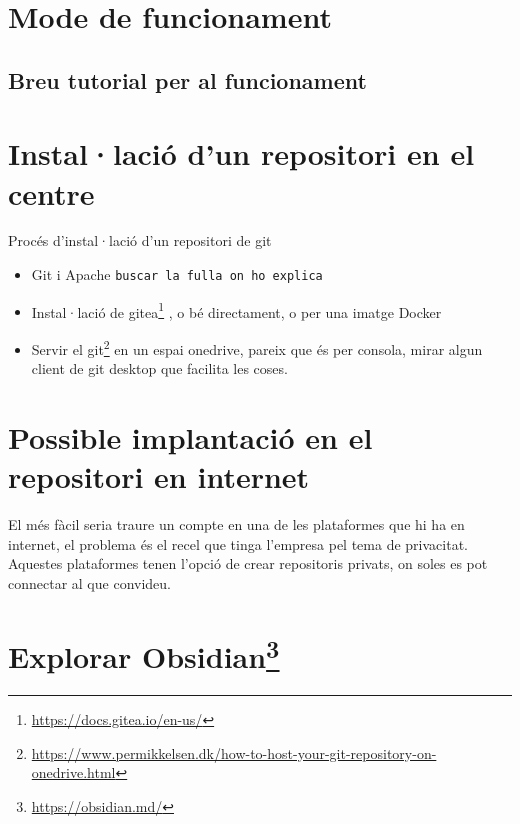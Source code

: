 \documentclass[
  10pt,
]{krantz}
\DeclareRobustCommand{\href}[2]{#2\footnote{\url{#1}}}
\begin{document}
\hypertarget{mode-de-funcionament}{%
\section{Mode de funcionament}\label{mode-de-funcionament}}

\hypertarget{breu-tutorial-per-al-funcionament}{%
\subsection{Breu tutorial per al funcionament}\label{breu-tutorial-per-al-funcionament}}

\hypertarget{installaciuxf3-dun-repositori-en-el-centre}{%
\section{Instal·lació d'un repositori en el centre}\label{installaciuxf3-dun-repositori-en-el-centre}}

Procés d'instal·lació d'un repositori de git

\begin{itemize}
\item
  Git i Apache \texttt{buscar\ la\ fulla\ on\ ho\ explica}
\item
  Instal·lació de \href{https://docs.gitea.io/en-us/}{gitea} , o bé directament, o per una imatge Docker
\item
  Servir el \href{https://www.permikkelsen.dk/how-to-host-your-git-repository-on-onedrive.html}{git} en un espai onedrive, pareix que és per consola, mirar algun client de git desktop que facilita les coses.
\end{itemize}

\hypertarget{possible-implantaciuxf3-en-el-repositori-en-internet}{%
\section{Possible implantació en el repositori en internet}\label{possible-implantaciuxf3-en-el-repositori-en-internet}}

El més fàcil seria traure un compte en una de les plataformes que hi ha en internet, el problema és el recel que tinga l'empresa pel tema de privacitat. Aquestes plataformes tenen l'opció de crear repositoris privats, on soles es pot connectar al que convideu.

\hypertarget{explorar-obsidian}{%
\section{\texorpdfstring{Explorar \href{https://obsidian.md/}{Obsidian}}{Explorar Obsidian}}\label{explorar-obsidian}}
\end{document}
